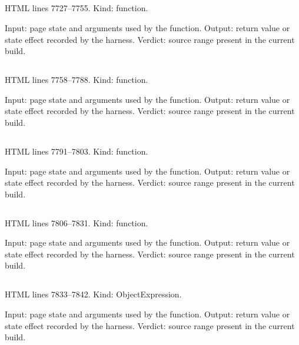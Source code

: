 \subsection*{\texttt{}}
\label{vf_387_mgViewGraphs}
HTML lines 7727--7755. Kind: function.

Input: page state and arguments used by the function.
Output: return value or state effect recorded by the harness.
Verdict: source range present in the current build.

\subsection*{\texttt{}}
\label{vf_388_mgViewReview}
HTML lines 7758--7788. Kind: function.

Input: page state and arguments used by the function.
Output: return value or state effect recorded by the harness.
Verdict: source range present in the current build.

\subsection*{\texttt{}}
\label{vf_389_mgViewIntegrity}
HTML lines 7791--7803. Kind: function.

Input: page state and arguments used by the function.
Output: return value or state effect recorded by the harness.
Verdict: source range present in the current build.

\subsection*{\texttt{}}
\label{vf_390_mgViewExport}
HTML lines 7806--7831. Kind: function.

Input: page state and arguments used by the function.
Output: return value or state effect recorded by the harness.
Verdict: source range present in the current build.

\subsection*{\texttt{}}
\label{vf_391_MG_VIEWS}
HTML lines 7833--7842. Kind: ObjectExpression.

Input: page state and arguments used by the function.
Output: return value or state effect recorded by the harness.
Verdict: source range present in the current build.

